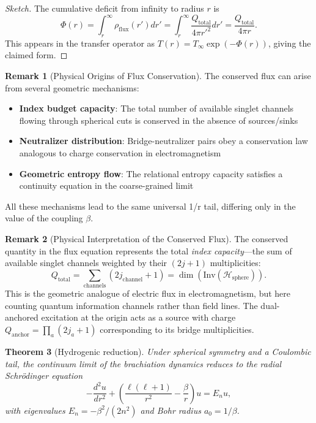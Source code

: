 \documentclass[11pt]{article}
\theoremstyle{plain}
\newtheorem{theorem}{Theorem}[section]
\theoremstyle{definition}
\newtheorem{remark}[theorem]{Remark}
\begin{document}
\begin{proof}[Sketch]
  The cumulative deficit from infinity to radius $r$ is
  \[
    \Phi(r) = \int_r^\infty \rho_{\text{flux}}(r') dr' = \int_r^\infty \frac{Q_{\text{total}}}{4\pi r'^2} dr' = \frac{Q_{\text{total}}}{4\pi r}.
  \]
  This appears in the transfer operator as $T(r) = T_\infty \exp(-\Phi(r))$, giving the claimed form.
\end{proof}

\begin{remark}[Physical Origins of Flux Conservation]
  The conserved flux can arise from several geometric mechanisms:
  \begin{itemize}
    \item \textbf{Index budget capacity}: The total number of available singlet channels
      flowing through spherical cuts is conserved in the absence of sources/sinks
    \item \textbf{Neutralizer distribution}: Bridge-neutralizer pairs obey a conservation
      law analogous to charge conservation in electromagnetism
    \item \textbf{Geometric entropy flow}: The relational entropy capacity satisfies a
      continuity equation in the coarse-grained limit
  \end{itemize}
  All these mechanisms lead to the same universal 1/r tail, differing only in the
  value of the coupling $\beta$.
\end{remark}

\begin{remark}[Physical Interpretation of the Conserved Flux]
  The conserved quantity in the flux equation represents the total \emph{index capacity}---the sum of available singlet channels weighted by their $(2j+1)$ multiplicities:
  \[
    Q_{\text{total}} = \sum_{\text{channels}} (2j_{\text{channel}} + 1) = \dim(\text{Inv}(\mathcal{H}_{\text{sphere}})).
  \]
  This is the geometric analogue of electric flux in electromagnetism, but here counting quantum information channels rather than field lines. The dual-anchored excitation at the origin acts as a source with charge $Q_{\text{anchor}} = \prod_a (2j_a + 1)$ corresponding to its bridge multiplicities.
\end{remark}

\begin{theorem}[Hydrogenic reduction]
  Under spherical symmetry and a Coulombic tail, the continuum limit of the brachiation
  dynamics reduces to the radial Schrödinger equation
  \[
    -\frac{d^2u}{dr^2} + \left(\frac{\ell(\ell+1)}{r^2} - \frac{\beta}{r}\right)u = E_n u,
  \]
  with eigenvalues $E_n = -\beta^2/(2n^2)$ and Bohr radius $a_0 = 1/\beta$.
\end{theorem}
\end{document}
